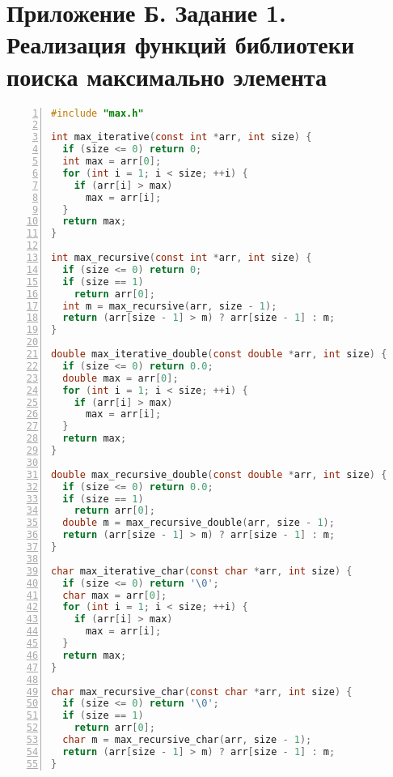 \section*{Приложение Б. Задание 1. Реализация функций библиотеки поиска максимально элемента}

\begin{lstlisting}[language=C,numbers=left]
#include "max.h"

int max_iterative(const int *arr, int size) {
  if (size <= 0) return 0;
  int max = arr[0];
  for (int i = 1; i < size; ++i) {
    if (arr[i] > max)
      max = arr[i];
  }
  return max;
}

int max_recursive(const int *arr, int size) {
  if (size <= 0) return 0;
  if (size == 1)
    return arr[0];
  int m = max_recursive(arr, size - 1);
  return (arr[size - 1] > m) ? arr[size - 1] : m;
}

double max_iterative_double(const double *arr, int size) {
  if (size <= 0) return 0.0;
  double max = arr[0];
  for (int i = 1; i < size; ++i) {
    if (arr[i] > max)
      max = arr[i];
  }
  return max;
}

double max_recursive_double(const double *arr, int size) {
  if (size <= 0) return 0.0;
  if (size == 1)
    return arr[0];
  double m = max_recursive_double(arr, size - 1);
  return (arr[size - 1] > m) ? arr[size - 1] : m;
}

char max_iterative_char(const char *arr, int size) {
  if (size <= 0) return '\0';
  char max = arr[0];
  for (int i = 1; i < size; ++i) {
    if (arr[i] > max)
      max = arr[i];
  }
  return max;
}

char max_recursive_char(const char *arr, int size) {
  if (size <= 0) return '\0';
  if (size == 1)
    return arr[0];
  char m = max_recursive_char(arr, size - 1);
  return (arr[size - 1] > m) ? arr[size - 1] : m;
}
\end{lstlisting}